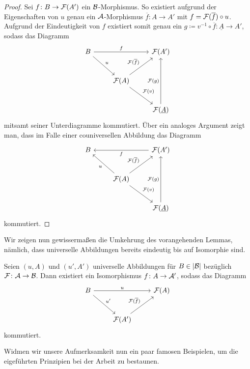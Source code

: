 \begin{proof}
  Sei $f \colon B \to \mathcal{F}(A')$ ein $\mathcal{B}$-Morphismus. 
  So existiert aufgrund der Eigenschaften von $u$ genau ein $\mathcal{A}$-Morphismus $\overline f \colon A \to A'$ mit $f = \mathcal{F}(\overline f) \circ u$.
  Aufgrund der Eindeutigkeit von $f$ existiert somit genau ein $g \coloneqq v^{-1} \circ \overline f \colon \underline A \to A'$, sodass das Diagramm   
  $$
  \begin{tikzcd}[row sep=2.5em]
    B \arrow[rd,"u"] \arrow[rr, "f"] &&\F(A') \\
    &\F(A) \arrow[ru, "\F(\overline{f})"] \arrow[rd,"\F(v)"] \\
    &&\F(\underline A) \arrow[uu,"\F(g)"]
  \end{tikzcd}
  $$
  mitsamt seiner Unterdiagramme kommutiert.
  Über ein analoges Argument zeigt man, dass im Falle einer couniversellen Abbildung das Diagramm
  $$
  \begin{tikzcd}[row sep=2.5em]
    B  & & \F(A') \arrow[ll, "f"]  \\
    & \F(A)\arrow[ru, "\F(\overline{f})"] \arrow[lu,"u"] \arrow[rd, "\F(v)"]  & \\
    & & \F(\underline A) \arrow[uu, "\F(g)"]
  \end{tikzcd}
  $$
  kommutiert.
\end{proof}

Wir zeigen nun gewissermaßen die Umkehrung des vorangehenden Lemmas, nämlich, dass universelle Abbildungen bereits eindeutig bis auf Isomorphie sind.

\begin{prop}
  Seien $(u,A)$ und $(u',A')$ universelle Abbildungen für $B \in |\mathcal{B}|$ bezüglich $\mathcal{F} \colon \mathcal{A} \to \mathcal{B}$.
  Dann existiert ein Isomorphismus $f \colon A \to \mathcal{A}'$, sodass das Diagramm
  $$
  \begin{tikzcd}[row sep=2.5em]
    B \arrow[rd,"u'"] \arrow[rr, "u"] &&\F(A) \\
    &\F(A') \arrow[ru, "\F(\overline{f})"]
  \end{tikzcd}
  $$
  kommutiert.
\end{prop}

Widmen wir unsere Aufmerksamkeit nun ein paar famosen Beispielen, um die eigeführten Prinzipien bei der Arbeit zu bestaunen.

